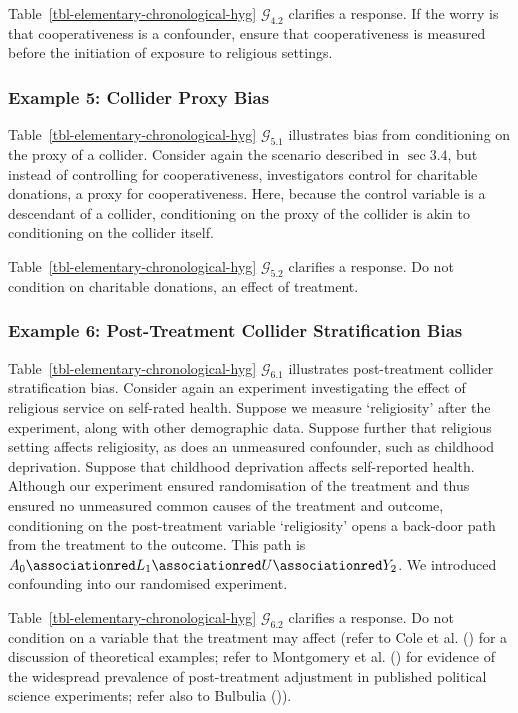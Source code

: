 \documentclass[
  single column]{article}
\begin{document}
Table~\ref{tbl-elementary-chronological-hyg} \(\mathcal{G}_{4.2}\)
clarifies a response. If the worry is that cooperativeness is a
confounder, ensure that cooperativeness is measured before the
initiation of exposure to religious settings.

\subsubsection{Example 5: Collider Proxy
Bias}\label{example-5-collider-proxy-bias}

Table~\ref{tbl-elementary-chronological-hyg} \(\mathcal{G}_{5.1}\)
illustrates bias from conditioning on the proxy of a collider. Consider
again the scenario described in \(\sec 3.4\), but instead of controlling
for cooperativeness, investigators control for charitable donations, a
proxy for cooperativeness. Here, because the control variable is a
descendant of a collider, conditioning on the proxy of the collider is
akin to conditioning on the collider itself.

Table~\ref{tbl-elementary-chronological-hyg} \(\mathcal{G}_{5.2}\)
clarifies a response. Do not condition on charitable donations, an
effect of treatment.

\subsubsection{Example 6: Post-Treatment Collider Stratification
Bias}\label{example-6-post-treatment-collider-stratification-bias}

Table~\ref{tbl-elementary-chronological-hyg} \(\mathcal{G}_{6.1}\)
illustrates post-treatment collider stratification bias. Consider again
an experiment investigating the effect of religious service on
self-rated health. Suppose we measure `religiosity' after the
experiment, along with other demographic data. Suppose further that
religious setting affects religiosity, as does an unmeasured confounder,
such as childhood deprivation. Suppose that childhood deprivation
affects self-reported health. Although our experiment ensured
randomisation of the treatment and thus ensured no unmeasured common
causes of the treatment and outcome, conditioning on the post-treatment
variable `religiosity' opens a back-door path from the treatment to the
outcome. This path is
\(A_0 \associationred L_1 \associationred U \associationred Y_2\). We
introduced confounding into our randomised experiment.

Table~\ref{tbl-elementary-chronological-hyg} \(\mathcal{G}_{6.2}\)
clarifies a response. Do not condition on a variable that the treatment
may affect (refer to Cole et al. () for a
discussion of theoretical examples; refer to Montgomery et al.
() for evidence of the widespread
prevalence of post-treatment adjustment in published political science
experiments; refer also to Bulbulia
()).
\end{document}
